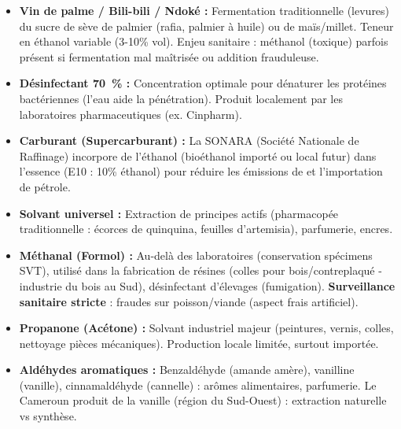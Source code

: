 \documentclass[11pt]{article}
\begin{document}
\begin{savaistu}
\begin{itemize}
\item \textbf{Vin de palme / Bili-bili / Ndoké :} Fermentation traditionnelle (levures) du sucre de sève de palmier (rafia, palmier à huile) ou de maïs/millet. Teneur en éthanol variable (3-10\% vol). Enjeu sanitaire : méthanol (toxique) parfois présent si fermentation mal maîtrisée ou addition frauduleuse.
\item \textbf{Désinfectant \SI{70}{\%} :} Concentration optimale pour dénaturer les protéines bactériennes (l'eau aide la pénétration). Produit localement par les laboratoires pharmaceutiques (ex. Cinpharm).
\item \textbf{Carburant (Supercarburant) :} La SONARA (Société Nationale de Raffinage) incorpore de l'éthanol (bioéthanol importé ou local futur) dans l'essence (E10 : 10\% éthanol) pour réduire les émissions de  et l'importation de pétrole.
\item \textbf{Solvant universel :} Extraction de principes actifs (pharmacopée traditionnelle : écorces de quinquina, feuilles d'artemisia), parfumerie, encres.
\end{itemize}
\end{savaistu}

\begin{savaistu}
\begin{itemize}
\item \textbf{Méthanal (Formol) :} Au-delà des laboratoires (conservation spécimens SVT), utilisé dans la fabrication de résines (colles pour bois/contreplaqué - industrie du bois au Sud), désinfectant d'élevages (fumigation). \textbf{Surveillance sanitaire stricte} : fraudes sur poisson/viande (aspect frais artificiel).
\item \textbf{Propanone (Acétone) :} Solvant industriel majeur (peintures, vernis, colles, nettoyage pièces mécaniques). Production locale limitée, surtout importée.
\item \textbf{Aldéhydes aromatiques :} Benzaldéhyde (amande amère), vanilline (vanille), cinnamaldéhyde (cannelle) : arômes alimentaires, parfumerie. Le Cameroun produit de la vanille (région du Sud-Ouest) : extraction naturelle vs synthèse.
\end{itemize}
\end{savaistu}
\end{document}
